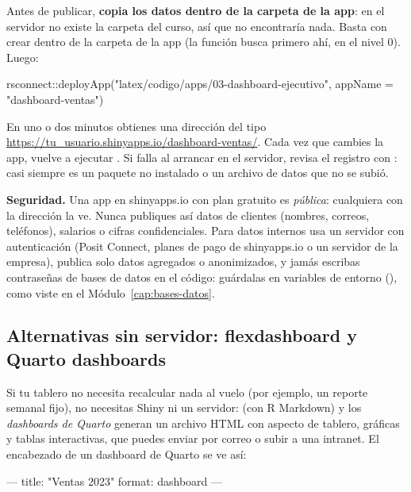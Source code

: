 Antes de publicar, \textbf{copia los datos dentro de la carpeta de la app}:
en el servidor no existe la carpeta del curso, así que
 no encontraría nada. Basta con crear
 dentro de la carpeta de la app (la función busca
primero ahí, en el nivel 0). Luego:

\begin{rnoejecutar}
rsconnect::deployApp("latex/codigo/apps/03-dashboard-ejecutivo",
                     appName = "dashboard-ventas")
\end{rnoejecutar}

En uno o dos minutos obtienes una dirección del tipo
\url{https://tu_usuario.shinyapps.io/dashboard-ventas/}. Cada vez que
cambies la app, vuelve a ejecutar . Si falla al
arrancar en el servidor, revisa el registro con
: casi siempre es un paquete no instalado o
un archivo de datos que no se subió.

\begin{advertencia}
\textbf{Seguridad.} Una app en shinyapps.io con plan gratuito es
\emph{pública}: cualquiera con la dirección la ve. Nunca publiques así datos
de clientes (nombres, correos, teléfonos), salarios o cifras
confidenciales. Para datos internos usa un servidor con autenticación
(Posit Connect, planes de pago de shinyapps.io o un servidor de la empresa),
publica solo datos agregados o anonimizados, y jamás escribas contraseñas
de bases de datos en el código: guárdalas en variables de entorno
(), como viste en el Módulo~\ref{cap:bases-datos}.
\end{advertencia}

\subsection{Alternativas sin servidor: flexdashboard y Quarto dashboards}

Si tu tablero no necesita recalcular nada al vuelo (por ejemplo, un reporte
semanal fijo), no necesitas Shiny ni un servidor: 
(con R Markdown) y los \emph{dashboards de Quarto} generan un archivo HTML
con aspecto de tablero, gráficas  y tablas 
interactivas, que puedes enviar por correo o subir a una intranet. El
encabezado de un dashboard de Quarto se ve así:

\begin{textocodigo}
---
title: "Ventas 2023"
format: dashboard
---
\end{textocodigo}

